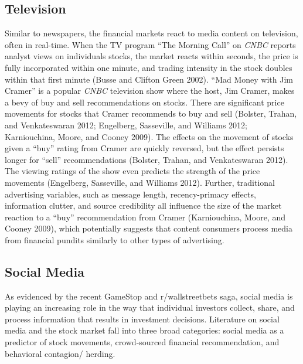 \documentclass[12pt,]{article}
\begin{document}
\hypertarget{television}{%
\subsection{Television}\label{television}}

Similar to newspapers, the financial markets react to media content on
television, often in real-time. When the TV program ``The Morning Call''
on \emph{CNBC} reports analyst views on individuals stocks, the market
reacts within seconds, the price is fully incorporated within one
minute, and trading intensity in the stock doubles within that first
minute (Busse and Clifton Green 2002). ``Mad Money with Jim Cramer'' is
a popular \emph{CNBC} television show where the host, Jim Cramer, makes
a bevy of buy and sell recommendations on stocks. There are significant
price movements for stocks that Cramer recommends to buy and sell
(Bolster, Trahan, and Venkateswaran 2012; Engelberg, Sasseville, and
Williams 2012; Karniouchina, Moore, and Cooney 2009). The effects on the
movement of stocks given a ``buy'' rating from Cramer are quickly
reversed, but the effect persists longer for ``sell'' recommendations
(Bolster, Trahan, and Venkateswaran 2012). The viewing ratings of the
show even predicts the strength of the price movements (Engelberg,
Sasseville, and Williams 2012). Further, traditional advertising
variables, such as message length, recency-primacy effects, information
clutter, and source credibility all influence the size of the market
reaction to a ``buy'' recommendation from Cramer (Karniouchina, Moore,
and Cooney 2009), which potentially suggests that content consumers
process media from financial pundits similarly to other types of
advertising.

\hypertarget{social-media}{%
\subsection{Social Media}\label{social-media}}

As evidenced by the recent GameStop and r/wallstreetbets saga, social
media is playing an increasing role in the way that individual investors
collect, share, and process information that results in investment
decisions. Literature on social media and the stock market fall into
three broad categories: social media as a predictor of stock movements,
crowd-sourced financial recommendation, and behavioral contagion/
herding.
\end{document}
